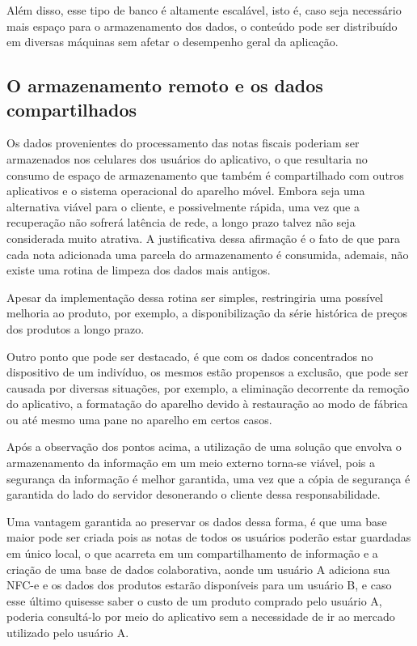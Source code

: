Além disso, esse tipo de banco é altamente escalável, isto é, caso seja necessário mais espaço para o armazenamento dos dados, o conteúdo pode ser distribuído em diversas máquinas sem afetar o desempenho geral da aplicação.

\subsection{O armazenamento remoto e os dados compartilhados}

Os dados provenientes do processamento das notas fiscais poderiam ser armazenados nos celulares dos usuários do aplicativo, o que resultaria no consumo de espaço de armazenamento que também é compartilhado com outros aplicativos e o sistema operacional do aparelho móvel. Embora seja uma alternativa viável para o cliente, e possivelmente rápida, uma vez que a recuperação não sofrerá latência de rede, a longo prazo talvez não seja considerada muito atrativa. A justificativa dessa afirmação é o fato de que para cada nota adicionada uma parcela do armazenamento é consumida, ademais, não existe uma rotina de limpeza dos dados mais antigos.

Apesar da implementação dessa rotina ser simples, restringiria uma possível melhoria ao produto, por exemplo, a disponibilização da série histórica de preços dos produtos a longo prazo.

Outro ponto que pode ser destacado, é que com os dados concentrados no dispositivo de um indivíduo, os mesmos estão propensos a exclusão, que pode ser causada por diversas situações, por exemplo, a eliminação decorrente da remoção do aplicativo, a formatação do aparelho devido à restauração ao modo de fábrica ou até mesmo uma pane no aparelho em certos casos.

Após a observação dos pontos acima, a utilização de uma solução que envolva o armazenamento da informação em um meio externo torna-se viável, pois a segurança da informação é melhor garantida, uma vez que a cópia de segurança é garantida do lado do servidor desonerando o cliente dessa responsabilidade.

Uma vantagem garantida ao preservar os dados dessa forma, é que uma base maior pode ser criada pois as notas de todos os usuários poderão estar guardadas em único local, o que acarreta em um compartilhamento de informação e a criação de uma base de dados colaborativa, aonde um usuário A adiciona sua NFC-e e os dados dos produtos estarão disponíveis para um usuário B, e caso esse último quisesse saber o custo de um produto comprado pelo usuário A, poderia consultá-lo por meio do aplicativo sem a necessidade de ir ao mercado utilizado pelo usuário A.

